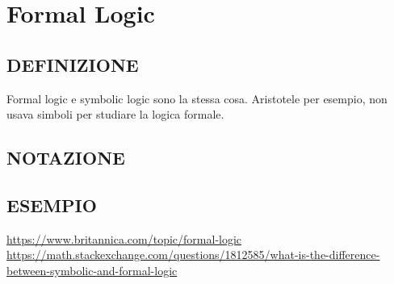 \chapter{Formal Logic}

\section{DEFINIZIONE}
Formal logic e symbolic logic sono la stessa cosa. Aristotele per esempio, non usava simboli per studiare la logica formale.

\section{NOTAZIONE}

\section{ESEMPIO}

\begin{thebibliography}{100}
   \url{https://www.britannica.com/topic/formal-logic}
   \url{https://math.stackexchange.com/questions/1812585/what-is-the-difference-between-symbolic-and-formal-logic}
\end{thebibliography}

